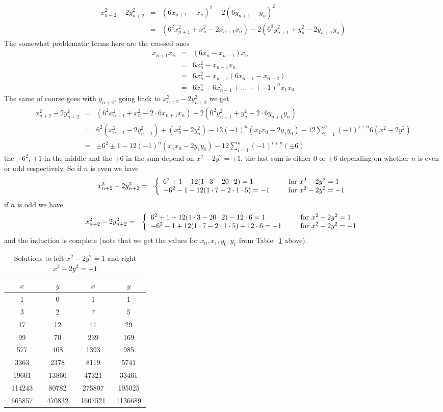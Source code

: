 \documentclass[aps,preprint,preprintnumbers,nofootinbib,showpacs,prd]{revtex4-1}
\newcommand{\nbea}{\begin{eqnarray*}}
\newcommand{\neea}{\end{eqnarray*}}
\begin{document}
%
\nbea
x_{n+2}^2 - 2 y_{n+2}^2 & = & (6x_{n+1} - x_n)^2 - 2 (6y_{n+1} - y_n)^2 \\
& = & (6^2 x_{n+1}^2 + x_n^2 - 2x_{n+1}x_n) - 2 (6^2 y_{n+1}^2 + y_n^2 - 2y_{n+1}y_n)
\neea
%
The somewhat problematic terms here are the crossed ones
%
\nbea
x_{n+1} x_n & = & (6 x_n - x_{n-1})x_n \\
& = & 6x_n^2 - x_{n-1}x_n \\
& = & 6 x_n^2 - x_{n-1}(6x_{n-1} - x_{n-2}) \\
& = & 6 x_n^2 - 6 x_{n-1}^2 + \dots + (-1)^{n} x_1 x_0
\neea
%
The same of course goes with $y_{n+2}$, going back to $x_{n+2}^2 - 2 y_{n+2}^2$ we get
%
\nbea
x_{n+2}^2 - 2 y_{n+2}^2 & = & (6^2 x_{n+1}^2 + x_n^2 - 2\cdot 6 x_{n+1}x_n) - 2 (6^2 y_{n+1}^2 + y_n^2 - 2\cdot 6y_{n+1}y_n) \\
& = & 6^2 (x_{n+1}^2 - 2 y_{n+1}^2) + (x_n^2 - 2y_n^2) - 12 (-1)^n(x_1 x_0 - 2 y_1 y_0) - 12 \sum_{i = 1}^n (-1)^{i+n} 6(x^2 - 2y^2) \\
& = & \pm6^2 \pm 1 - 12 (-1)^n(x_1x_0 -2 y_1y_0) - 12 \sum_{i = 1}^n (-1)^{i+n} (\pm6)
\neea
%
the $\pm6^2$, $\pm1$ in the middle and the $\pm6$ in the sum depend on $x^2 -2y^2 = \pm1$, the last sum is either $0$ or $\pm6$ depending on whether $n$ is even or odd respectively. So if $n$ is even we have
%
\nbea
x_{n+2}^2 - 2 y_{n+2}^2 & = & \left \{
\begin{array}{l l}
6^2 + 1 - 12(1\cdot3 -2 0\cdot 2) = 1 &~~~~~{\rm for}~ x^2 - 2y^2 = 1 \\
-6^2 - 1 - 12(1\cdot7 -2 \cdot1\cdot 5) = -1 &~~~~~{\rm for}~ x^2 - 2y^2 = -1
\end{array}
\right .
\neea
%
if $n$ is odd we have
%
\nbea
x_{n+2}^2 - 2 y_{n+2}^2 & = & \left \{
\begin{array}{l l}
6^2 + 1 + 12(1\cdot3 -2 0\cdot 2) -12\cdot6= 1 &~~~~~{\rm for}~ x^2 - 2y^2 = 1 \\
-6^2 - 1 + 12(1\cdot7 -2 \cdot1\cdot 5) + 12 \cdot 6 = -1 &~~~~~{\rm for}~ x^2 - 2y^2 = -1
\end{array}
\right .
\neea
%
and the induction is complete (note that we get the values for $x_0,x_1,y_0,y_1$ from Table.~\ref{Tab:1} above).

%
\begin{table}[]
\centering
\caption{Solutions to left $x^2 - 2y^2 = 1$ and right $x^2 - 2y^2 = -1$}
\label{Tab:1}
\begin{tabular}{|c|c|c|c|}
\hline
~~~$x$~~~ & ~~~$y$~~~ & ~~~$x$~~~ & ~~~$y$~~~  \\ \hline 
1 & 0 & 1 & 1 \\
3 & 2 & 7 & 5 \\
17 & 12 & 41 & 29 \\ 
99 & 70 & 239 & 169 \\
577 & 408 & 1393 & 985 \\
3363 & 2378 & 8119 & 5741 \\
19601 & 13860 & 47321 & 33461 \\
114243 & 80782 & 275807 & 195025 \\
665857 & 470832 & 1607521 & 1136689 \\
\hline
\end{tabular}
\end{table}
%
\end{document}

